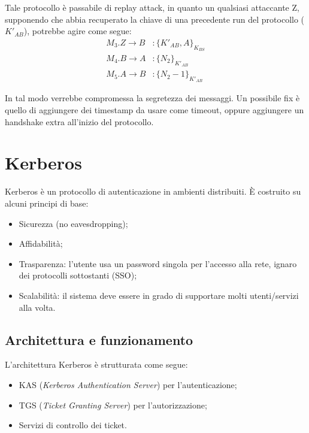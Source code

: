 \documentclass[a4paper, 10pt, twoside]{article}
\begin{document}
	Tale protocollo è passabile di replay attack, in quanto un qualsiasi attaccante Z, supponendo che abbia recuperato la chiave di una precedente run del protocollo ($K'_{AB}$), potrebbe agire come segue:
	\begin{align*}
		M_3. Z \to B&: \lbrace K'_{AB}, A\rbrace_{K_{BS}} \\
		M_4. B \to A&: \lbrace N_2\rbrace_{K'_{AB}}\\
		M_5. A \to B&: \lbrace N_2-1\rbrace_{K'_{AB}}
	\end{align*}
	
	In tal modo verrebbe compromessa la segretezza dei messaggi. Un possibile fix è quello di aggiungere dei timestamp da usare come timeout, oppure aggiungere un handshake extra all'inizio del protocollo.
	
	\section{Kerberos}
	Kerberos è un protocollo di autenticazione in ambienti distribuiti. È costruito su alcuni principi di base: \begin{itemize}
		\item Sicurezza (no eavesdropping);
		\item Affidabilità;
		\item Trasparenza: l'utente usa un password singola per l'accesso alla rete, ignaro dei protocolli sottostanti (SSO);
		\item Scalabilità: il sistema deve essere in grado di supportare molti utenti/servizi alla volta.
	\end{itemize}
	
	\subsection{Architettura e funzionamento}
	L'architettura Kerberos è strutturata come segue: \begin{itemize}
		\item KAS (\textit{Kerberos Authentication Server}) per l'autenticazione;
		\item TGS (\textit{Ticket Granting Server}) per l'autorizzazione;
		\item Servizi di controllo dei ticket.
	\end{itemize}
	
\end{document}
